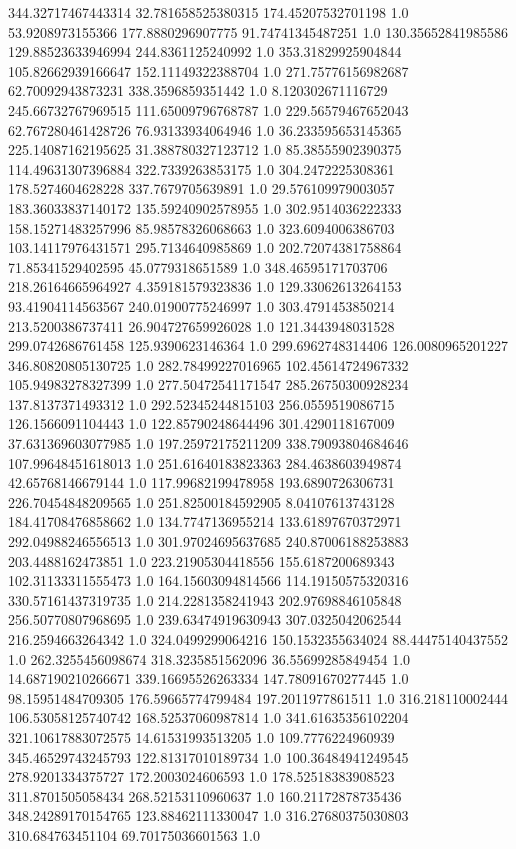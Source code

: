 344.32717467443314	32.781658525380315	174.45207532701198	1.0
53.9208973155366	177.8880296907775	91.74741345487251	1.0
130.35652841985586	129.88523633946994	244.8361125240992	1.0
353.31829925904844	105.82662939166647	152.11149322388704	1.0
271.75776156982687	62.70092943873231	338.3596859351442	1.0
8.120302671116729	245.66732767969515	111.65009796768787	1.0
229.56579467652043	62.767280461428726	76.93133934064946	1.0
36.233595653145365	225.14087162195625	31.388780327123712	1.0
85.38555902390375	114.49631307396884	322.7339263853175	1.0
304.2472225308361	178.5274604628228	337.7679705639891	1.0
29.576109979003057	183.36033837140172	135.59240902578955	1.0
302.9514036222333	158.15271483257996	85.98578326068663	1.0
323.6094006386703	103.14117976431571	295.7134640985869	1.0
202.72074381758864	71.85341529402595	45.0779318651589	1.0
348.46595171703706	218.26164665964927	4.359181579323836	1.0
129.33062613264153	93.41904114563567	240.01900775246997	1.0
303.4791453850214	213.5200386737411	26.904727659926028	1.0
121.3443948031528	299.0742686761458	125.9390623146364	1.0
299.6962748314406	126.0080965201227	346.80820805130725	1.0
282.78499227016965	102.45614724967332	105.94983278327399	1.0
277.50472541171547	285.26750300928234	137.8137371493312	1.0
292.52345244815103	256.0559519086715	126.1566091104443	1.0
122.85790248644496	301.4290118167009	37.631369603077985	1.0
197.25972175211209	338.79093804684646	107.99648451618013	1.0
251.61640183823363	284.4638603949874	42.65768146679144	1.0
117.99682199478958	193.6890726306731	226.70454848209565	1.0
251.82500184592905	8.04107613743128	184.41708476858662	1.0
134.7747136955214	133.61897670372971	292.04988246556513	1.0
301.97024695637685	240.87006188253883	203.4488162473851	1.0
223.21905304418556	155.6187200689343	102.31133311555473	1.0
164.15603094814566	114.19150575320316	330.57161437319735	1.0
214.2281358241943	202.97698846105848	256.50770807968695	1.0
239.63474919630943	307.0325042062544	216.2594663264342	1.0
324.0499299064216	150.1532355634024	88.44475140437552	1.0
262.3255456098674	318.3235851562096	36.55699285849454	1.0
14.687190210266671	339.16695526263334	147.78091670277445	1.0
98.15951484709305	176.59665774799484	197.2011977861511	1.0
316.218110002444	106.53058125740742	168.52537060987814	1.0
341.61635356102204	321.10617883072575	14.61531993513205	1.0
109.7776224960939	345.46529743245793	122.81317010189734	1.0
100.36484941249545	278.9201334375727	172.2003024606593	1.0
178.52518383908523	311.8701505058434	268.52153110960637	1.0
160.21172878735436	348.24289170154765	123.88462111330047	1.0
316.27680375030803	310.684763451104	69.70175036601563	1.0
